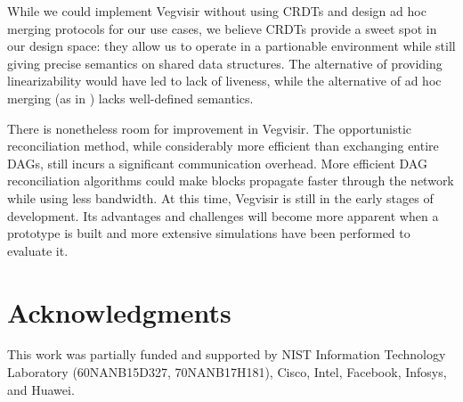 \documentclass[conference, letterpaper]{IEEEtran}
\begin{document}
While we could implement Vegvisir without using CRDTs and design ad hoc merging protocols for our use cases, we believe CRDTs provide a sweet spot in our design space: they allow us to operate in a partionable environment while still giving precise semantics on shared data structures. The alternative of providing linearizability would have led to lack of liveness, while the alternative of ad hoc merging (as in \cite{terry1995managing, lloyd_dont_2011}) lacks well-defined semantics.

There is nonetheless room for improvement in Vegvisir. The opportunistic reconciliation method, while considerably more efficient than exchanging entire DAGs, still incurs a significant communication overhead. More efficient DAG reconciliation algorithms could make blocks propagate faster through the network while using less bandwidth.
At this time, Vegvisir is still in the early stages of development. Its advantages and challenges will become more apparent when a prototype is built and more extensive simulations have been performed to evaluate it.




\section*{Acknowledgments}
This work was partially funded and supported by NIST Information Technology Laboratory (60NANB15D327, 70NANB17H181), Cisco, Intel, Facebook, Infosys, and Huawei.







%
%
\end{document}
